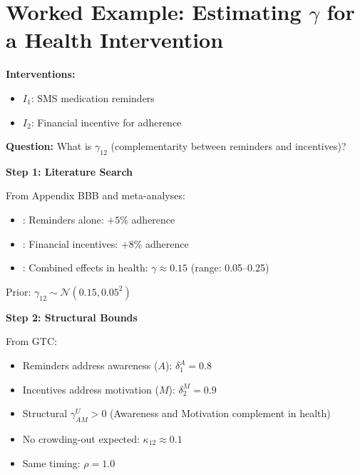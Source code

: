 \section{Worked Example: Estimating $\gamma$ for a Health Intervention}
\label{sec:worked-example}

\begin{tcolorbox}[colback=blue!5!white,colframe=blue!75!black,title=\textbf{Case: MediCare Medication Adherence Program}]
\textbf{Interventions:}
\begin{itemize}[noitemsep]
    \item $I_1$: SMS medication reminders
    \item $I_2$: Financial incentive for adherence
\end{itemize}

\textbf{Question:} What is $\gamma_{12}$ (complementarity between reminders and incentives)?
\end{tcolorbox}

\textbf{Step 1: Literature Search}

From Appendix BBB and meta-analyses:
\begin{itemize}
    \item \citet{karlan2011}: Reminders alone: $+5\%$ adherence
    \item \citet{thaler2004}: Financial incentives: $+8\%$ adherence
    \item \citet{volpp2008}: Combined effects in health: $\gamma \approx 0.15$ (range: 0.05–0.25)
\end{itemize}

Prior: $\gamma_{12} \sim \mathcal{N}(0.15, 0.05^2)$

\textbf{Step 2: Structural Bounds}

From GTC:
\begin{itemize}
    \item Reminders address awareness ($A$): $\delta_1^A = 0.8$
    \item Incentives address motivation ($M$): $\delta_2^M = 0.9$
    \item Structural $\gamma^U_{AM} > 0$ (Awareness and Motivation complement in health)
    \item No crowding-out expected: $\kappa_{12} \approx 0.1$
    \item Same timing: $\rho = 1.0$
\end{itemize}

